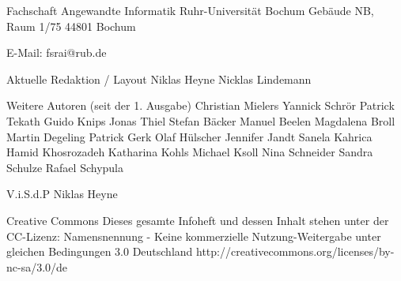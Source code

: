Fachschaft Angewandte Informatik
Ruhr-Universität Bochum
Gebäude NB, Raum 1/75
44801 Bochum

E-Mail: fsrai@rub.de

Aktuelle Redaktion / Layout
Niklas Heyne
Nicklas Lindemann

Weitere Autoren (seit der 1. Ausgabe)
Christian Mielers
Yannick Schrör
Patrick Tekath
Guido Knips
Jonas Thiel
Stefan Bäcker
Manuel Beelen
Magdalena Broll
Martin Degeling
Patrick Gerk
Olaf Hülscher
Jennifer Jandt
Sanela Kahrica
Hamid Khosrozadeh
Katharina Kohls
Michael Ksoll
Nina Schneider
Sandra Schulze
Rafael Schypula

V.i.S.d.P
Niklas Heyne

Creative Commons
Dieses gesamte Infoheft und dessen Inhalt stehen unter der CC-Lizenz: Namensnennung - Keine kommerzielle Nutzung-Weitergabe unter gleichen Bedingungen 3.0 Deutschland
http://creativecommons.org/licenses/by-nc-sa/3.0/de
